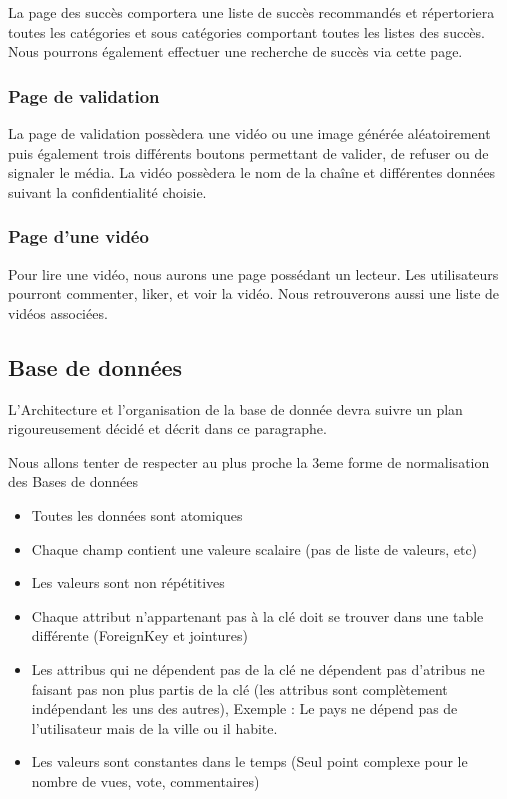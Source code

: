 \documentclass[a4paper,10pt]{article}
\begin{document}
La page des succès comportera une liste de succès recommandés et répertoriera toutes les catégories et sous catégories comportant toutes les listes des succès. Nous pourrons également effectuer une recherche de succès via cette page.

\subsubsection{Page de validation}

La page de validation possèdera une vidéo ou une image générée aléatoirement puis également trois différents boutons permettant de valider, de refuser ou de signaler le média. La vidéo possèdera le nom de la chaîne et différentes données suivant la confidentialité choisie.

\subsubsection{Page d'une vidéo}

Pour lire une vidéo, nous aurons une page possédant un lecteur. Les utilisateurs pourront commenter, liker, et voir la vidéo. Nous retrouverons aussi une liste de vidéos associées.

\subsection{Base de données}

L'Architecture et l'organisation de la base de donnée devra suivre un plan rigoureusement décidé et décrit dans ce paragraphe.

Nous allons tenter de respecter au plus proche la 3eme forme de normalisation des Bases de données

\begin{itemize}
\item Toutes les données sont atomiques 
\item Chaque champ contient une valeure scalaire (pas de liste de valeurs, etc)
\item Les valeurs sont non répétitives
\item Chaque attribut n'appartenant pas à la clé doit se trouver dans une table différente (ForeignKey et jointures)
\item Les attribus qui ne dépendent pas de la clé ne dépendent pas d'atribus ne faisant pas non plus partis de la clé (les attribus sont complètement indépendant les uns des autres), Exemple : Le pays ne dépend pas de l'utilisateur mais de la ville ou il habite.
\item Les valeurs sont constantes dans le temps (Seul point complexe pour le nombre de vues, vote, commentaires)
\end{itemize}
\end{document}
